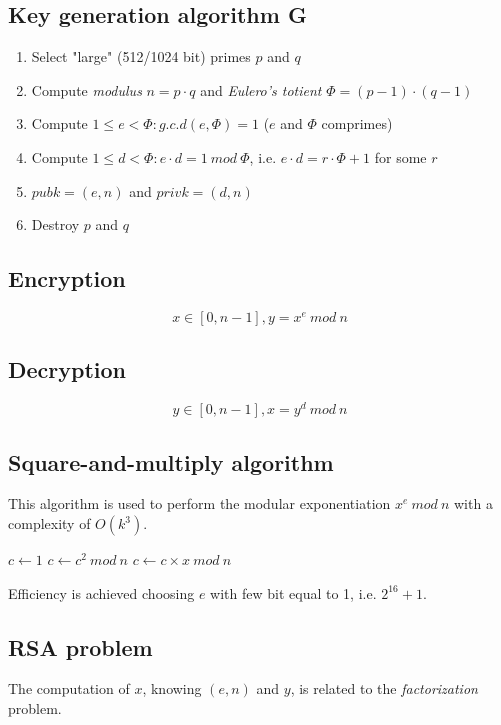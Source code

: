 \documentclass[a4paper,12pt]{article}
\begin{document}
\subsection{Key generation algorithm G}
\begin{enumerate}
	\item Select "large" (512/1024 bit) primes $p$ and $q$
	\item Compute \textit{modulus} $n = p \cdot q$ and \textit{Eulero's totient} $\Phi = (p-1)\cdot(q-1)$
	\item Compute $1 \leq e < \Phi : g.c.d(e, \Phi) = 1$ ($e$ and $\Phi$ comprimes)
	\item Compute $1 \leq d < \Phi : e\cdot d = 1\ mod\ \Phi$, i.e. $e\cdot d = r\cdot\Phi + 1$ for some $r$
	\item $pubk = (e,n)$ and $privk = (d,n)$
	\item Destroy $p$ and $q$
\end{enumerate}

\subsection{Encryption}
$$ x \in [0, n-1], y = x^e\ mod\ n$$

\subsection{Decryption}
$$ y \in [0, n-1], x = y^d\ mod\ n$$

\subsection{Square-and-multiply algorithm}
This algorithm is used to perform the modular exponentiation $x^e\ mod\ n$ with a complexity of $O(k^3)$.

\begin{algorithm}[H]
\begin{algorithmic}
\State $c \gets 1$
	\State $c \gets c^2\ mod\ n$
	 \State $c \gets c \times x\ mod\ n$ \EndIf

\EndFor
\end{algorithmic}
\end{algorithm}


Efficiency is achieved choosing $e$ with few bit equal to 1, i.e. $2^{16} + 1$.

\subsection{RSA problem}
The computation of $x$, knowing $(e,n)$ and $y$, is related to the \textit{factorization} problem.
\end{document}
